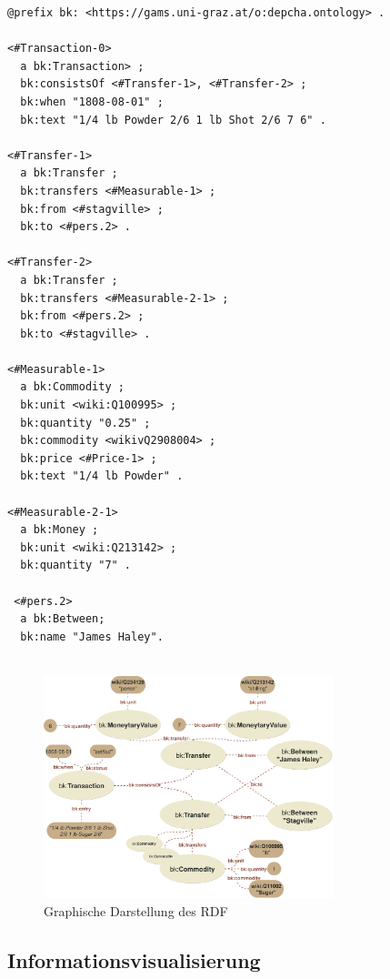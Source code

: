 \documentclass[12pt,a4paper]{article}
\begin{document}
\begin{lstlisting}[]
@prefix bk: <https://gams.uni-graz.at/o:depcha.ontology> .

<#Transaction-0>
  a bk:Transaction> ;
  bk:consistsOf <#Transfer-1>, <#Transfer-2> ;
  bk:when "1808-08-01" ;
  bk:text "1/4 lb Powder 2/6 1 lb Shot 2/6 7 6" .

<#Transfer-1>
  a bk:Transfer ;
  bk:transfers <#Measurable-1> ;
  bk:from <#stagville> ;
  bk:to <#pers.2> .

<#Transfer-2>
  a bk:Transfer ;
  bk:transfers <#Measurable-2-1> ;
  bk:from <#pers.2> ;
  bk:to <#stagville> .

<#Measurable-1>
  a bk:Commodity ;
  bk:unit <wiki:Q100995> ;
  bk:quantity "0.25" ;
  bk:commodity <wikivQ2908004> ;
  bk:price <#Price-1> ;
  bk:text "1/4 lb Powder" .

<#Measurable-2-1>
  a bk:Money ;
  bk:unit <wiki:Q213142> ;
  bk:quantity "7" .
  
 <#pers.2>
  a bk:Between;
  bk:name "James Haley".
  
\end{lstlisting}

\begin{figure}[H]
\centering
	\includegraphics[width=0.75\textwidth]{img/example.png}  
    \caption[Graphische Darstellung des RDF, eigene Darstellung, 01.06.2019.]{Graphische Darstellung des RDF} \label{fig:example}
\end{figure}

\newpage
\subsection{Informationsvisualisierung}
\end{document}
